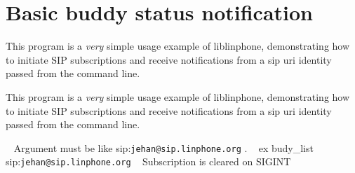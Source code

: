 \section{Basic buddy status notification}
\label{group__buddy__tutorials}


This program is a {\itshape very} simple usage example of liblinphone, demonstrating how to initiate S\+IP subscriptions and receive notifications from a sip uri identity passed from the command line.  


This program is a {\itshape very} simple usage example of liblinphone, demonstrating how to initiate S\+IP subscriptions and receive notifications from a sip uri identity passed from the command line. 

~\newline
Argument must be like sip\+:{\tt jehan@sip.\+linphone.\+org} . ~\newline
 ex budy\+\_\+list sip\+:{\tt jehan@sip.\+linphone.\+org} ~\newline
Subscription is cleared on S\+I\+G\+I\+NT ~\newline
 
